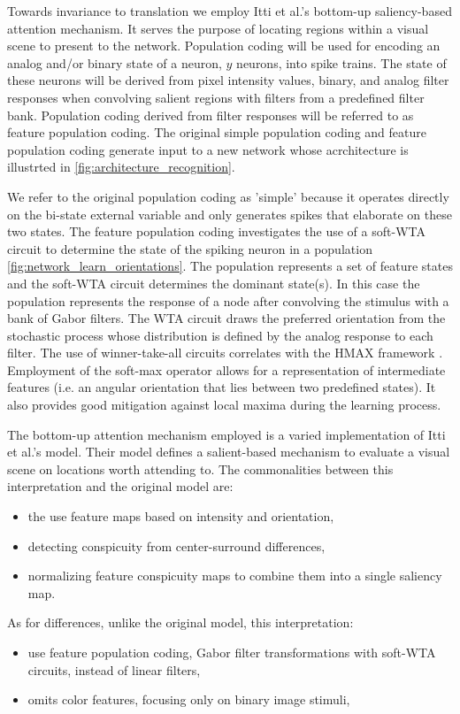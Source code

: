 \documentclass{report}
\begin{document}
Towards invariance to translation we employ Itti et al.'s bottom-up saliency-based attention mechanism. It serves the purpose of locating regions within a visual scene to present to the network. Population coding will be used for encoding an analog and/or binary state of a neuron, $y$ neurons, into spike trains. The state of these neurons will be derived from pixel intensity values, binary, and analog filter responses when convolving salient regions with filters from a predefined filter bank. Population coding derived from filter responses will be referred to as feature population coding. The original simple population coding and feature population coding generate input to a new network whose acrchitecture is illustrted in \cref{fig:architecture_recognition}.

We refer to the original population coding as 'simple' because it operates directly on the bi-state external variable and only generates spikes that elaborate on these two states. The feature population coding investigates the use of a soft-WTA circuit to determine the state of the spiking neuron in a population \ref{fig:network_learn_orientations}. The population represents a set of feature states and the soft-WTA circuit determines the dominant state(s). In this case the population represents the response of a node after convolving the stimulus with a bank of Gabor filters. The WTA circuit draws the preferred orientation from the stochastic process whose distribution is defined by the analog response to each filter. The use of winner-take-all circuits correlates with the HMAX framework \cite{Serre04realisticmodeling, Riesenhuber1999}. Employment of the soft-max operator allows for a representation of intermediate features (i.e. an angular orientation that lies between two predefined states). It also provides good mitigation against local maxima during the learning process.

The bottom-up attention mechanism employed is a varied implementation of Itti et al.'s model. Their model defines a salient-based mechanism to evaluate a visual scene on locations worth attending to.
The commonalities between this interpretation and the original model are:
\begin{itemize}
  \item the use feature maps based on intensity and orientation,
  \item detecting conspicuity from center-surround differences,
  \item normalizing feature conspicuity maps to combine them into a single saliency map.
\end{itemize}
As for differences, unlike the original model, this interpretation:
\begin{itemize}
  \item use feature population coding, Gabor filter transformations with soft-WTA circuits, instead of linear filters,
  \item omits color features, focusing only on binary image stimuli,
\end{itemize}
\end{document}
